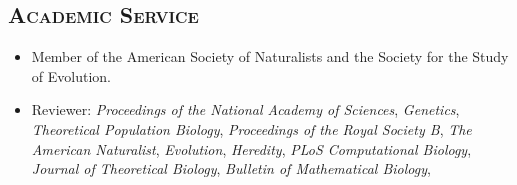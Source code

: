 \documentclass[centered,overlapped,line]{res}
\begin{document}
\begin{resume}


  \section{\bf \large \scshape  Academic Service}
  \begin{itemize}[]
  \item Member of the American Society of Naturalists and the Society for the Study of Evolution.
  \item Reviewer: \textit{Proceedings of the National Academy of Sciences}, \textit{Genetics}, \textit{Theoretical Population Biology}, \textit{Proceedings of the Royal Society B}, \textit{The American Naturalist}, \textit{Evolution}, \textit{Heredity}, \textit{PLoS Computational Biology}, \textit{Journal of Theoretical Biology}, \textit{Bulletin of Mathematical Biology},
  \end{itemize}


\end{resume}
\end{document}
